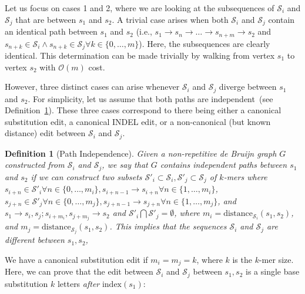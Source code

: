 \documentclass[11pt]{article}
\newtheorem{defn}{Definition}
\begin{document}
Let us focus on cases 1 and 2, where we are looking at the subsequences of $\mathcal{S}_i$ and
$\mathcal{S}_j$ that are between $s_1$ and $s_2$. A trivial case arises when both $\mathcal{S}_i$ and
$\mathcal{S}_j$ contain an identical path between $s_1$ and $s_2$ (i.e.,
$s_1 \rightarrow s_n \rightarrow \dots \rightarrow s_{n + m} \rightarrow s_2$ and
$s_{n + k} \in \mathcal{S}_i \wedge s_{n + k} \in \mathcal{S}_j \forall k \in \{0, \dots , m\}$). Here, the
subsequences are clearly identical. This determination can be made trivially by walking from vertex $s_1$
to vertex $s_2$ with $\mathcal{O}(m)$ cost.

However, three distinct cases can arise whenever $\mathcal{S}_i$ and $\mathcal{S}_j$ diverge between
$s_1$ and $s_2$. For simplicity, let us assume that both paths are independent~(see
Definition~\ref{defn:path-independence}). These three cases correspond to there being either a canonical
substitution edit, a canonical INDEL edit, or a non-canonical (but known distance) edit between
$\mathcal{S}_i$ and $\mathcal{S}_j$.

\begin{defn}[Path Independence]
\label{defn:path-independence}
Given a non-repetitive de Bruijn graph $G$ constructed from $\mathcal{S}_i$ and $\mathcal{S}_j$, we say
that $G$ contains independent paths between $s_1$ and $s_2$ if we can construct two subsets
$\mathcal{S}'_i \subset \mathcal{S}_i, \mathcal{S}'_j \subset \mathcal{S}_j$ of $k$-mers where $s_{i + n}
\in \mathcal{S}'_i \forall n \in \{0, \dots, m_i\}, s_{i + n - 1} \rightarrow s_{i + n} \forall n \in \{1, \dots, m_i\}$,
$s_{j + n} \in \mathcal{S}'_j \forall n \in \{0, \dots, m_j\}, s_{j + n - 1} \rightarrow s_{j + n} \forall n \in \{1,
\dots, m_j\}$, and $s_1 \rightarrow s_i, s_j; s_{i + m_i}, s_{j + m_j} \rightarrow s_2$ and $\mathcal{S}'_i
\bigcap \mathcal{S}'_j = \emptyset$, where $m_i = \text{distance}_{\mathcal{S}_i}(s_1, s_2)$, and $m_j =
\text{distance}_{\mathcal{S}_j}(s_1, s_2)$. This implies that the sequences $\mathcal{S}_i$ and
$\mathcal{S}_j$ are different between $s_1, s_2$,
\end{defn}

We have a canonical substitution edit if $m_i = m_j = k$, where $k$ is the $k$-mer size. Here, we can
prove that the edit between $\mathcal{S}_i$ and $\mathcal{S}_j$ between $s_1, s_2$ is a single base
substitution $k$ letters \emph{after} $\text{index}(s_1)$:
\end{document}
